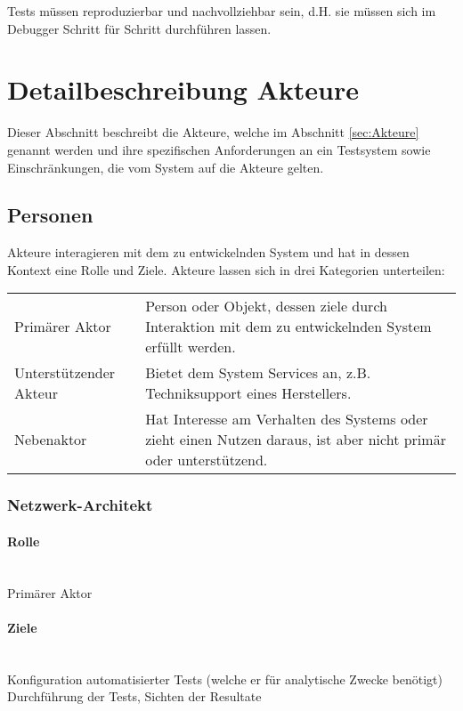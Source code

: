 \documentclass[
	ngerman,
	toc=listof, %
	toc=bibliography, %
	footnotes=multiple, %
	parskip=half, %
	numbers=noendperiod %
]{scrartcl}
\begin{document}
		Tests müssen reproduzierbar und nachvollziehbar sein, d.H. sie müssen sich im Debugger Schritt für Schritt durchführen lassen.
			
\section{Detailbeschreibung Akteure}
Dieser Abschnitt beschreibt die Akteure, welche im Abschnitt \ref{sec:Akteure} genannt werden und ihre spezifischen Anforderungen an ein Testsystem sowie Einschränkungen, die vom System auf die Akteure gelten.
	
	\subsection{Personen}
	Akteure interagieren mit dem zu entwickelnden System und hat in dessen Kontext eine Rolle und Ziele.
	Akteure lassen sich in drei Kategorien unterteilen: 
		
		\begin{tabularx}{\textwidth}{lX}
			\toprule
				Primärer Aktor & Person oder Objekt, dessen ziele durch Interaktion mit dem zu entwickelnden System erfüllt werden.\\
				Unterstützender Akteur & Bietet dem System Services an, z.B. Techniksupport eines Herstellers.\\
				Nebenaktor & Hat Interesse am Verhalten des Systems oder zieht einen Nutzen daraus, ist aber nicht primär oder unterstützend. \\
			\bottomrule
		\end{tabularx}

		\subsubsection{Netzwerk-Architekt}
		
			\paragraph{Rolle} ~\\
			Primärer Aktor 

			\paragraph{Ziele} ~\\ 
			Konfiguration automatisierter Tests (welche er für analytische Zwecke benötigt) 
			Durchführung der Tests, 
			Sichten der Resultate
			
\end{document}
